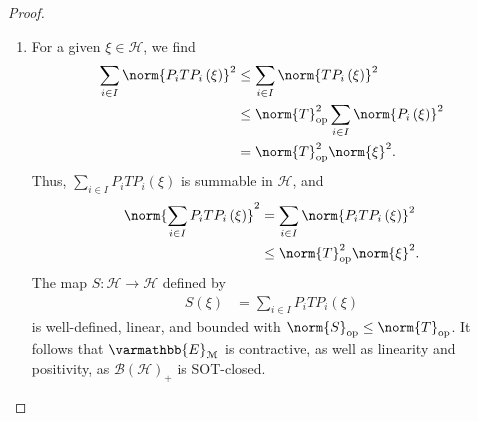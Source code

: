 \documentclass[10pt]{mypackage}
\renewcommand*{\mathbb}[1]{\varmathbb{#1}}
\begin{document}
\begin{proof}\hfill
  \begin{enumerate}[(1)]
    \item For a given $\xi\in \mathcal{H}$, we find
      \begin{align*}
        \sum_{i\in I}\norm{P_iTP_i\left(\xi\right)}^2 &\leq \sum_{i\in I}\norm{TP_i\left(\xi\right)}^2\\
                                                      &\leq \norm{T}_{\text{op}}^2\sum_{i\in I}\norm{P_i\left(\xi\right)}^2\\
                                                      &= \norm{T}_{\text{op}}^2\norm{\xi}^2.
      \end{align*}
      Thus, $\sum_{i\in I}P_iTP_i\left(\xi\right)$ is summable in $\mathcal{H}$, and
      \begin{align*}
        \norm{\sum_{i\in I}P_iTP_i\left(\xi\right)}^2 &= \sum_{i\in I}\norm{P_iTP_i\left(\xi\right)}^2\\
                                                      &\leq \norm{T}_{\text{op}}^2\norm{\xi}^2.
      \end{align*}
      The map $S\colon \mathcal{H}\rightarrow \mathcal{H}$ defined by
      \begin{align*}
        S\left(\xi\right) &= \sum_{i\in I}P_iTP_i\left(\xi\right)
      \end{align*}
      is well-defined, linear, and bounded with $\norm{S}_{\text{op}}\leq \norm{T}_{\text{op}}$. It follows that $\mathbb{E}_{\mathcal{M}}$ is contractive, as well as linearity and positivity, as $\mathcal{B}\left(\mathcal{H}\right)_{+}$ is SOT-closed.\newline


\end{enumerate}
\end{proof}
\end{document}

